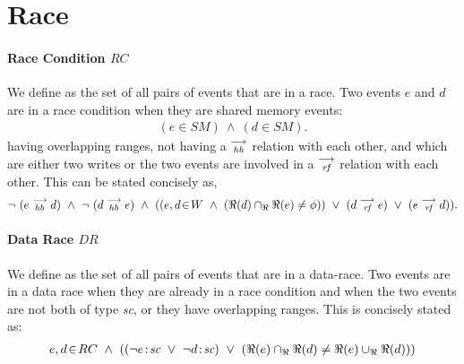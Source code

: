        
    \section{Race}
        
        \paragraph{Race Condition $RC$} 
            We define  as the set of all pairs of events that are in a race. Two events $e$ and $d$ are in a race condition when they are shared memory events:
            \begin{align*}
                (e \in SM)\ \wedge\ (d \in SM).
            \end{align*}
            having overlapping ranges, not having a $\stackrel{\longrightarrow}{_\textit{hb}}$ relation with each other, and which are either two writes or the two events are involved in a $\stackrel{\longrightarrow}{_\textit{rf}}$ relation with each other. This can be stated concisely as,
            \begin{align*}
                \neg \ (\reln{e}{hb}{d})\ \wedge\ \neg \ (\reln{d}{hb}{e}) 
                \ \wedge \ 
                (
                (\event{e,d}{W}\  \wedge\ (\Re(d) \cap_{\Re} \Re(e) \neq \phi)) 
                    \  \vee\ (d \stck{_\textit{rf}} e)\ \vee\ (e \stck{_\textit{rf}} d)
                ).
            \end{align*}
            
        
        \paragraph{Data Race $DR$} 
            We define  as the set of all pairs of events that are in a data-race. Two events are in a data race when they are already in a race condition and when the two events are not both of type \textit{sc}, or they have overlapping ranges. This is concisely stated as:  
            \begin{align*}
                \event{e,d}{RC}  \ \wedge \ 
                ((\neg\et{e}{sc} \ \vee \ \neg\et{d}{sc}) \ \vee \ 
                (\Re(e) \cap_{\Re} \Re(d) \neq \Re(e) \cup_{\Re} \Re(d))) 
            \end{align*}
            

